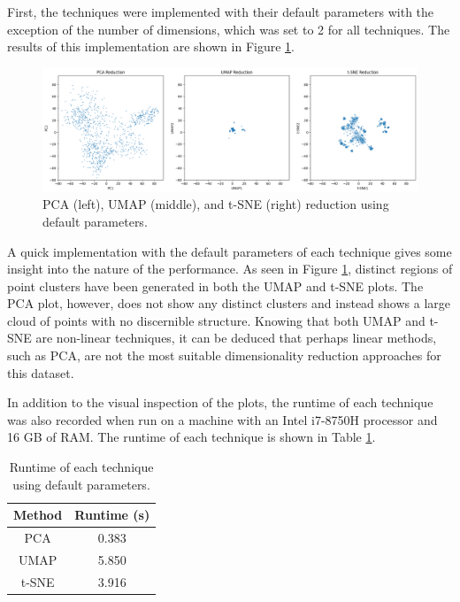 \documentclass[12pt]{article}
\begin{document}
First, the techniques were implemented with their default parameters with the exception of the number of dimensions, which was set to 2 for all techniques. The results of this implementation are shown in Figure \ref{fig:default_dimred}.

\begin{figure}[H]
    \centering
    \includegraphics[width=\textwidth]{Images/default_dimred.png}
    \caption{PCA (left), UMAP (middle), and t-SNE (right) reduction using default parameters.}
    \label{fig:default_dimred}
\end{figure}

\vspace{-0.5cm}

A quick implementation with the default parameters of each technique gives some insight into the nature of the performance. As seen in Figure \ref{fig:default_dimred}, distinct regions of point clusters have been generated in both the UMAP and t-SNE plots. The PCA plot, however, does not show any distinct clusters and instead shows a large cloud of points with no discernible structure. Knowing that both UMAP and t-SNE are non-linear techniques, it can be deduced that perhaps linear methods, such as PCA, are not the most suitable dimensionality reduction approaches for this dataset.

In addition to the visual inspection of the plots, the runtime of each technique was also recorded when run on a machine with an Intel i7-8750H processor and 16 GB of RAM. The runtime of each technique is shown in Table \ref{tab:default_dimred}.

\begin{table}[H]
    \centering
    \begin{tabular}{|c|c|}
        \hline
        \textbf{Method} & \textbf{Runtime (s)} \\
        \hline
        PCA & 0.383  \\
        UMAP & 5.850 \\
        t-SNE & 3.916 \\
        \hline
    \end{tabular}
    \caption{Runtime of each technique using default parameters.}
    \label{tab:default_dimred}
\end{table}
\end{document}
